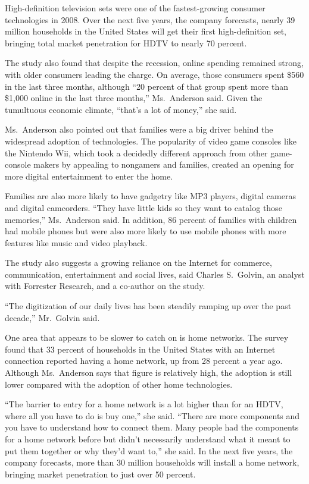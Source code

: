 ﻿\documentclass[12pt]{article}
\begin{document}
High-definition television sets were one of the fastest-growing consumer technologies in 2008. Over
the next five years, the company forecasts, nearly 39 million households in the United States will
get their first high-definition set, bringing total market penetration for HDTV to nearly 70
percent.

The study also found that despite the recession, online spending remained strong, with older
consumers leading the charge. On average, those consumers spent \$560 in the last three months,
although ``20 percent of that group spent more than \$1,000 online in the last three months,''
Ms.~Anderson said. Given the tumultuous economic climate, ``that's a lot of money,'' she said.

Ms.~Anderson also pointed out that families were a big driver behind the widespread adoption of
technologies. The popularity of video game consoles like the Nintendo Wii, which took a decidedly
different approach from other game-console makers by appealing to nongamers and families, created an
opening for more digital entertainment to enter the home.

Families are also more likely to have gadgetry like MP3 players, digital cameras and digital
camcorders. ``They have little kids so they want to catalog those memories,'' Ms.~Anderson said. In
addition, 86 percent of families with children had mobile phones but were also more likely to use
mobile phones with more features like music and video playback.

The study also suggests a growing reliance on the Internet for commerce, communication,
entertainment and social lives, said Charles S.~Golvin, an analyst with Forrester Research, and a
co-author on the study.

``The digitization of our daily lives has been steadily ramping up over the past decade,''
Mr.~Golvin said.

One area that appears to be slower to catch on is home networks. The survey found that 33 percent of
households in the United States with an Internet connection reported having a home network, up from
28 percent a year ago. Although Ms.~Anderson says that figure is relatively high, the adoption is
still lower compared with the adoption of other home technologies.

``The barrier to entry for a home network is a lot higher than for an HDTV, where all you have to do
is buy one,'' she said. ``There are more components and you have to understand how to connect them.
Many people had the components for a home network before but didn't necessarily understand what it
meant to put them together or why they'd want to,'' she said. In the next five years, the company
forecasts, more than 30 million households will install a home network, bringing market penetration
to just over 50 percent.
\end{document}
